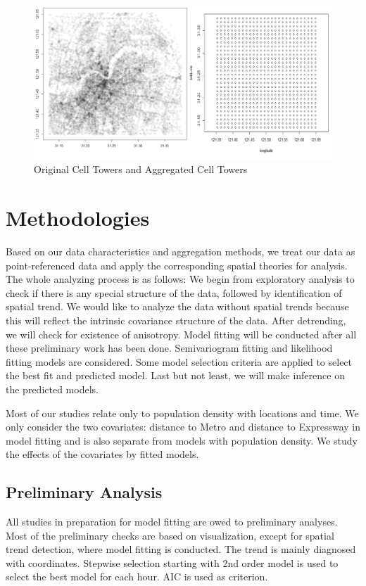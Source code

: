 \documentclass[hidelinks,12pt]{article}
\begin{document}
	\begin{figure}[!ht]
		\includegraphics[width=\textwidth]{tower.png}
		\caption{Original Cell Towers and Aggregated Cell Towers \label{fig:tower}}
	\end{figure}
	\FloatBarrier
	
	\section{Methodologies}\label{sec:meth}
	Based on our data characteristics and aggregation methods, we treat our data as point-referenced data and apply the corresponding spatial theories for analysis. The whole analyzing process is as follows: We begin from exploratory analysis to check if there is any special structure of the data, followed by identification of spatial trend. We would like to analyze the data without spatial trends because this will reflect the intrinsic covariance structure of the data. After detrending, we will check for existence of anisotropy. Model fitting will be conducted after all these preliminary work has been done. Semivariogram fitting and likelihood fitting models are considered. Some model selection criteria are applied to select the best fit and predicted model. Last but not least, we will make inference on the predicted models.
	
	Most of our studies relate only to population density with locations and time. We only consider the two covariates: distance to Metro and distance to Expressway in model fitting and is also separate from models with population density. We study the effects of the covariates by fitted models.
	
	\subsection{Preliminary Analysis}
 	All studies in preparation for model fitting are owed to preliminary analyses. Most of the preliminary checks are based on visualization, except for spatial trend detection, where model fitting is conducted. The trend is mainly diagnosed with coordinates. Stepwise selection starting with 2nd order model is used to select the best model for each hour. AIC is used as criterion.
 	
\end{document}
